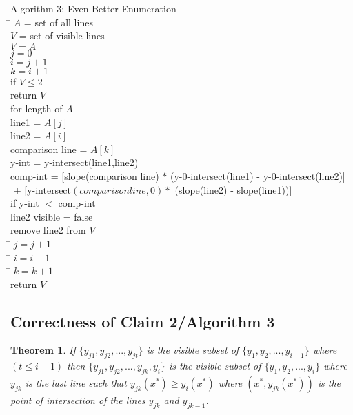 \documentclass{article}
\newtheorem{theorem}{Theorem}
\begin{document}
\begin{tabbing}
  {\sc Algorithm 3: Even Better Enumeration}\\
  \qquad \= $A$ = set of all lines\\
  \> $V$ = set of visible lines \\
  \> $V = A$ \\
  \> $j = 0$\\
  \> $i = j + 1$\\
  \> $k = i + 1$\\
  \> if $V \leq 2$\\
  \> \qquad return $V$ \\
  \> for length of $A$\\
  \> \qquad line1 = $A[j]$\\
  \> \qquad line2 = $A[i]$\\
  \> \qquad comparison line = $A[k]$\\
  \> \qquad y-int = y-intersect(line1,line2)\\
  \> \qquad comp-int = [slope(comparison line) $*$ (y-0-intersect(line1) - y-0-intersect(line2)]\\
  \> \qquad \= \qquad \= $+$  [y-intersect$(comparison line,0) *$ (slope(line2) - slope(line1))]\\ 
  \> \qquad if y-int $<$ comp-int\\
  \> \qquad \qquad line2 visible = false\\
  \> \qquad \qquad remove line2 from $V$\\
  \> \qquad \= $j = j+1$\\
  \> \qquad \= $i = i+1$\\
  \> \qquad \= $k = k+1$\\
  \> return $V$\\
\end{tabbing}

\subsection*{Correctness of Claim 2/Algorithm 3}

\begin{theorem}
  If \emph{$\{y_{j1},y_{j2},...,y_{jt}\}$} is the visible subset of \emph{$\{y_{1},y_{2},...,y_{i-1}\}$} where \emph{$(t \leq i-1)$} then $\{y_{j1},y_{j2},...,y_{jk},y_{i}\}$ is the visible subset of $\{y_{1},y_{2},...,y_{i}\}$ where $y_{jk}$ is the last line such that $y_{jk}(x^{*}) \geq y_{i}(x^{*})$ where $(x^{*},y_{jk}(x^{*}))$ is the point of intersection of the lines $y_{jk}$ and $y_{jk-1}$.
\end{theorem}
\end{document}
